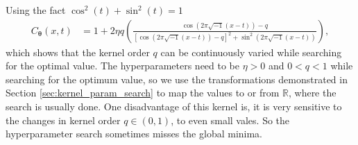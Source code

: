 \documentclass{iitthesis}          %
\newcommand{\bm}[1]{\boldsymbol{#1}}
\newcommand{\reals}{\mathbb{R}}
\newcommand{\vtheta}{{\bm{\theta}}}
\begin{document}
Using the fact $\cos^2(t) + \sin^2(t) = 1$
\begin{align*}
C_\vtheta(x, t) &= 
1 + 2 \eta q
\left(
\frac{ \cos({2 \pi\sqrt{-1} (x-t) }) - q }
{ \left[\cos({ 2 \pi\sqrt{-1} (x-t)})-q\right]^2 + \sin^2({ 2 \pi\sqrt{-1} (x-t)}) }
\right),
\end{align*}
which shows that the kernel order $q$ can be continuously varied while searching for the optimal value. 
The hyperparameters need to be $\eta > 0$ and $ 0 < q < 1$ while searching for the optimum value, so we use the transformations demonstrated in Section \ref{sec:kernel_param_search} to map the values to or from $\reals$, where the search is usually done.
One disadvantage of this kernel is, it is very sensitive to the changes in kernel order $q \in (0,1)$, to even small vales. So the hyperparameter search sometimes misses the global minima.
\end{document}
